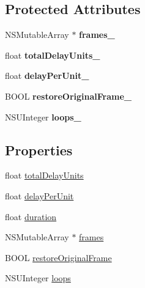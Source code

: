 \subsection*{Protected Attributes}
\begin{DoxyCompactItemize}
\item 
\hypertarget{interface_c_c_animation_a9540e24968974e1c36db2c2fd482220c}{N\-S\-Mutable\-Array $\ast$ {\bfseries frames\-\_\-}}\label{interface_c_c_animation_a9540e24968974e1c36db2c2fd482220c}

\item 
\hypertarget{interface_c_c_animation_aee7e499784589d7df831ed16e43d14cb}{float {\bfseries total\-Delay\-Units\-\_\-}}\label{interface_c_c_animation_aee7e499784589d7df831ed16e43d14cb}

\item 
\hypertarget{interface_c_c_animation_ac57aeae9aab241fbb40373d346cd3fa3}{float {\bfseries delay\-Per\-Unit\-\_\-}}\label{interface_c_c_animation_ac57aeae9aab241fbb40373d346cd3fa3}

\item 
\hypertarget{interface_c_c_animation_a9272ba6a4467136172277366525148c0}{B\-O\-O\-L {\bfseries restore\-Original\-Frame\-\_\-}}\label{interface_c_c_animation_a9272ba6a4467136172277366525148c0}

\item 
\hypertarget{interface_c_c_animation_a5ccbb2883dfb1b3541aa56f23ccf4f96}{N\-S\-U\-Integer {\bfseries loops\-\_\-}}\label{interface_c_c_animation_a5ccbb2883dfb1b3541aa56f23ccf4f96}

\end{DoxyCompactItemize}
\subsection*{Properties}
\begin{DoxyCompactItemize}
\item 
float \hyperlink{interface_c_c_animation_aa196f8f838f3c0a0a7370265f752a201}{total\-Delay\-Units}
\item 
float \hyperlink{interface_c_c_animation_a78370b61241db87d7ddad83be227f26a}{delay\-Per\-Unit}
\item 
float \hyperlink{interface_c_c_animation_af9b150cae2741992c739e3ea27a51727}{duration}
\item 
N\-S\-Mutable\-Array $\ast$ \hyperlink{interface_c_c_animation_af32fe84d0d2d7988ed0417e630bb4655}{frames}
\item 
B\-O\-O\-L \hyperlink{interface_c_c_animation_a1916fe4a2a89c8dc0bd38ca36b58cc27}{restore\-Original\-Frame}
\item 
N\-S\-U\-Integer \hyperlink{interface_c_c_animation_add5bdd7131501dbdab9ae814639fc754}{loops}
\end{DoxyCompactItemize}


